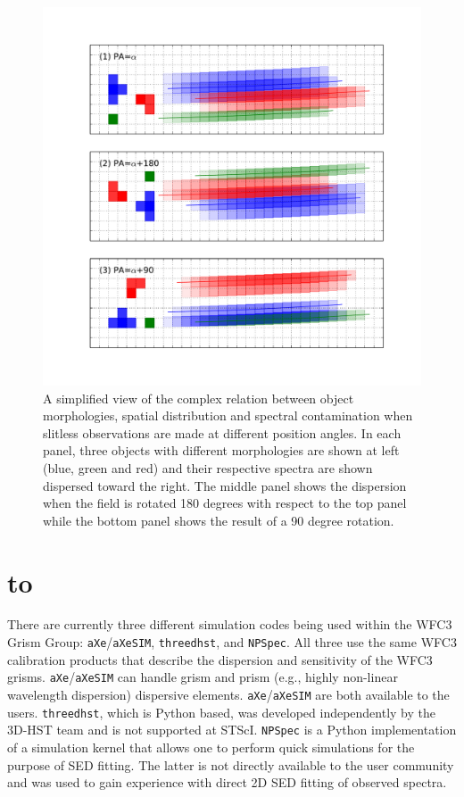 \documentclass[12pt]{article}
\def\ssection#1{\section{\hbox to \hsize{\large\bf #1\hfill}}}
\begin{document}
\begin{figure}[!ht]
\centering
\includegraphics[width=5.5in]{"Figures/contam_sim"}
\caption{A simplified view of the complex relation between object morphologies, spatial distribution and spectral contamination when slitless observations are made at different position angles. In each panel, three objects with different morphologies are shown at left (blue, green and red) and their respective spectra are shown dispersed toward the right. The middle panel shows the dispersion when the field is rotated 180 degrees with respect to the top panel while the bottom panel shows the result of a 90 degree rotation.}
\label{fig:2}
\end{figure}

\ssection{Grism Analysis Software}

There are currently three different simulation codes being used within the WFC3 Grism Group:  \texttt{aXe}/\texttt{aXeSIM}, \texttt{threedhst}, and \texttt{NPSpec}. All three use the same WFC3 calibration products that describe the dispersion and sensitivity of the WFC3 grisms. \texttt{aXe}/\texttt{aXeSIM} can handle grism and prism (e.g., highly non-linear wavelength dispersion) dispersive elements. \texttt{aXe}/\texttt{aXeSIM} are both available to the users. \texttt{threedhst}, which is Python based, was developed independently by the 3D-HST team and is not supported at STScI. \texttt{NPSpec} is a Python implementation of a simulation kernel that allows one to perform quick simulations for the purpose of SED fitting. The latter is not directly available to the user community and was used to gain experience with direct 2D SED fitting of observed spectra.
\end{document}
